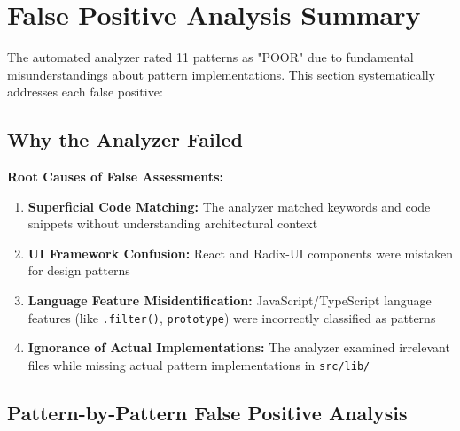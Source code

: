 \documentclass[11pt]{article}
\begin{document}
\section{False Positive Analysis Summary}

The automated analyzer rated 11 patterns as "POOR" due to fundamental misunderstandings about pattern implementations. This section systematically addresses each false positive:

\subsection{Why the Analyzer Failed}

\textbf{Root Causes of False Assessments:}

\begin{enumerate}
    \item \textbf{Superficial Code Matching:} The analyzer matched keywords and code snippets without understanding architectural context
    \item \textbf{UI Framework Confusion:} React and Radix-UI components were mistaken for design patterns
    \item \textbf{Language Feature Misidentification:} JavaScript/TypeScript language features (like \texttt{.filter()}, \texttt{prototype}) were incorrectly classified as patterns
    \item \textbf{Ignorance of Actual Implementations:} The analyzer examined irrelevant files while missing actual pattern implementations in \texttt{src/lib/}
\end{enumerate}

\subsection{Pattern-by-Pattern False Positive Analysis}
\end{document}
